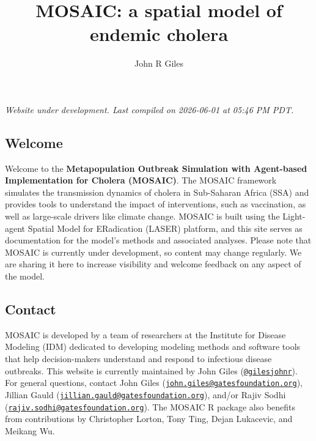 \documentclass[
]{book}
\title{MOSAIC: a spatial model of endemic cholera}
\author{John R Giles}
\date{}
\begin{document}
\maketitle

{
\setcounter{tocdepth}{1}
\tableofcontents
}
\chapter*{}\label{section}

\hfill\break

{\emph{
Website under development. Last compiled on 2026-06-01 at 05:46 PM PDT.
}}

\section*{Welcome}\label{welcome}

Welcome to the \textbf{Metapopulation Outbreak Simulation with Agent-based Implementation for Cholera (MOSAIC)}. The MOSAIC framework simulates the transmission dynamics of cholera in Sub-Saharan Africa (SSA) and provides tools to understand the impact of interventions, such as vaccination, as well as large-scale drivers like climate change. MOSAIC is built using the Light-agent Spatial Model for ERadication (LASER) platform, and this site serves as documentation for the model's methods and associated analyses. Please note that MOSAIC is currently under development, so content may change regularly. We are sharing it here to increase visibility and welcome feedback on any aspect of the model.

\section*{Contact}\label{contact}

MOSAIC is developed by a team of researchers at the Institute for Disease Modeling (IDM) dedicated to developing modeling methods and software tools that help decision-makers understand and respond to infectious disease outbreaks. This website is currently maintained by John Giles (\href{https://github.com/gilesjohnr}{\texttt{@gilesjohnr}}). For general questions, contact John Giles (\href{mailto:john.giles@gatesfoundation.org}{\nolinkurl{john.giles@gatesfoundation.org}}), Jillian Gauld (\href{mailto:jillian.gauld@gatesfoundation.org}{\nolinkurl{jillian.gauld@gatesfoundation.org}}), and/or Rajiv Sodhi (\href{mailto:rajiv.sodhi@gatesfoundation.org}{\nolinkurl{rajiv.sodhi@gatesfoundation.org}}). The MOSAIC R package also benefits from contributions by Christopher Lorton, Tony Ting, Dejan Lukacevic, and Meikang Wu.
\end{document}
